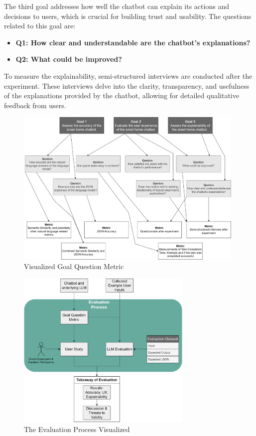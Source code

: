 The third goal addresses how well the chatbot can explain its actions and decisions to users, which is crucial for building trust and usability. The questions related to this goal are:

\begin{itemize}
    \item \textbf{Q1: How clear and understandable are the chatbot's explanations?}
    \item \textbf{Q2: What could be improved?}
\end{itemize}

To measure the explainability, semi-structured interviews are conducted after the experiment. These interviews delve into the clarity, transparency, and usefulness of the explanations provided by the chatbot, allowing for detailed qualitative feedback from users.

\begin{figure}[h]
    \centering
    \captionsetup{justification=centering}
    \includegraphics[width=0.98\textwidth]{graphics/gqm.png}
    \caption{Visualized Goal Question Metric}
    \label{fig:gqm}
\end{figure}
\begin{figure}[h]
    \centering
    \captionsetup{justification=centering}
    \includegraphics[width=0.75\textwidth]{graphics/eval-process.png}
    \caption{The Evaluation Process Visualized}
    \label{fig:evalprocess}
\end{figure}

